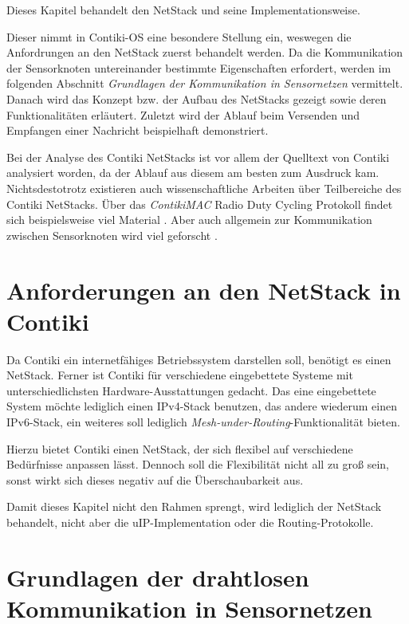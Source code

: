 \label{sec:NetStack}
	Dieses Kapitel behandelt den \ac{NetStack} und seine
	Implementationsweise.

	Dieser nimmt in Contiki-OS eine besondere Stellung ein, weswegen die
	Anfordrungen an den \ac{NetStack} zuerst behandelt werden.  Da die
	Kommunikation der Sensorknoten untereinander bestimmte Eigenschaften
	erfordert, werden im folgenden Abschnitt \emph{Grundlagen der
	Kommunikation in Sensornetzen} vermittelt.  Danach wird das Konzept
	bzw. der Aufbau des \ac{NetStack}s gezeigt sowie deren Funktionalitäten
	erläutert.  Zuletzt wird der Ablauf beim Versenden und Empfangen einer
	Nachricht beispielhaft demonstriert.


	Bei der Analyse des Contiki NetStacks ist vor allem der Quelltext von
	Contiki \autocite{Contiki:GitHub:2.6rc0} analysiert worden, da der
	Ablauf aus diesem am besten zum Ausdruck kam.  Nichtsdestotrotz
	existieren auch wissenschaftliche Arbeiten über Teilbereiche des
	Contiki NetStacks.  Über das \emph{ContikiMAC} Radio Duty Cycling
	Protokoll findet sich beispielsweise viel Material
	\autocite{dunkels11contikimac, ko12pragmatic, duquennoy11lossy}.  Aber
	auch allgemein zur Kommunikation zwischen Sensorknoten wird viel
	geforscht \autocite{lunden11politecast, dunkels11announcement,
	durvy08making}.


\section{Anforderungen an den \acl{NetStack} in Contiki}

	Da Contiki ein internetfähiges Betriebssystem darstellen soll, benötigt
	es einen \acl{NetStack}.  Ferner ist Contiki für verschiedene
	eingebettete Systeme mit unterschiedlichsten Hardware-Ausstattungen
	gedacht.  Das eine eingebettete System möchte lediglich einen
	IPv4-Stack benutzen, das andere wiederum einen IPv6-Stack, ein weiteres
	soll lediglich \emph{Mesh-under-Routing}-Funktionalität bieten.

	Hierzu bietet Contiki einen \acf{NetStack}, der sich flexibel auf
	verschiedene Bedürfnisse anpassen lässt. Dennoch soll die Flexibilität
	nicht all zu groß sein, sonst wirkt sich dieses negativ auf die
	Überschaubarkeit aus.

	Damit dieses Kapitel nicht den Rahmen sprengt, wird lediglich
	der \acl{NetStack} behandelt, nicht aber die \acs{uIP}-Implementation
	oder die Routing-Protokolle.


\section{Grundlagen der drahtlosen Kommunikation in Sensornetzen}

